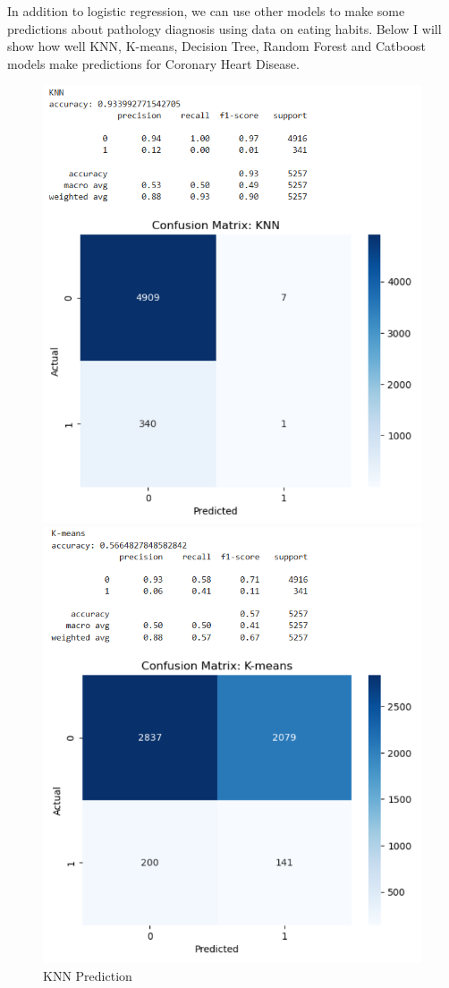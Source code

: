 \documentclass{article}
\begin{document}
In addition to logistic regression, we can use other models to make some predictions about pathology diagnosis using data on eating habits. Below I will show how well KNN, K-means, Decision Tree, Random Forest and Catboost models make predictions for Coronary Heart Disease.
\newpage
\begin{figure}[h!]
	\centering
	\begin{minipage}{0.32\textwidth}
		\centering
		\includegraphics[width=0.9\linewidth]{../Image/P8.jpg}
		\caption{KNN Prediction}
		\label{fig:P8}
	\end{minipage}\hfill
	\begin{minipage}{0.32\textwidth}
		\centering
		\includegraphics[width=0.9\linewidth]{../Image/P9.jpg}

\end{minipage}
\end{figure}
\end{document}
